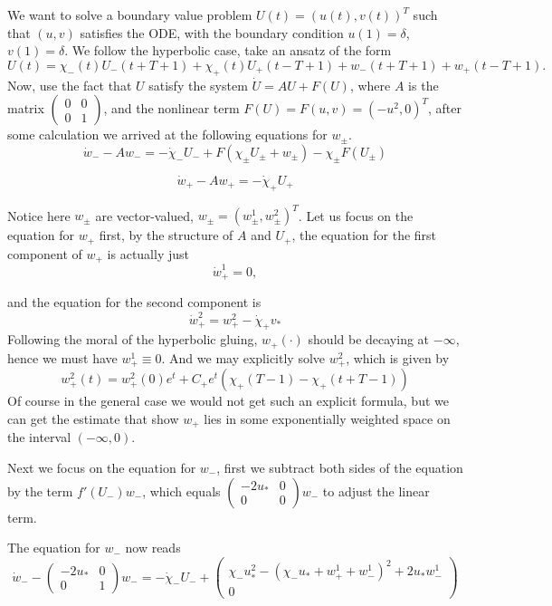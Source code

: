 \documentclass[letterpaper,11pt]{article}
\numberwithin{equation}{section}
\theoremstyle{plain}
\begin{document}
We want to solve a boundary value problem $U(t) = (u(t),v(t))^T$ such that $(u,v)$ satisfies the ODE, with the boundary condition $u(1) = \delta$, $v(1)=\delta$. We follow the hyperbolic case, take an ansatz of the form 
\[
U(t) = \chi_-(t)U_-(t+T+1) + \chi_+(t)U_+(t-T+1) + w_-(t+T+1)+w_+(t-T+1).
\]
Now, use the fact that $U$ satisfy the system $\dot{U} = AU + F(U)$, where $A$ is the matrix 
$\begin{pmatrix}
0&0\\
0&1
\end{pmatrix}$, and the nonlinear term $F(U) = F(u,v) = (-u^2,0)^T$, after some calculation we arrived at the following equations for $w_\pm$.
\begin{equation}
\dot{w}_- - Aw_- = -\dot{\chi}_- U_- + F(\chi_{\pm}U_{\pm}+w_\pm)-\chi_{\pm}F(U_\pm)
\end{equation}


\begin{equation}
\dot{w}_+ - Aw_+ = - \dot{\chi}_+ U_+
\end{equation}

Notice here $w_\pm$ are vector-valued, $w_\pm =  (w_\pm^1, w_\pm^2)^T$. Let us focus on the equation for $w_+$ first, by the structure of $A$ and $U_+$, the equation for the first component of $w_+$ is actually just
\[
\dot{w}^1_+ = 0,
\]

and the equation for the second component is
\[
\dot{w}^2_+  = w^2_+ - \dot{\chi}_+ v_*
\]
Following the moral of the hyperbolic gluing, $w_+(\cdot)$ should be decaying at $-\infty$, hence we must have $w_+^1 \equiv 0$. And we may explicitly solve $w_+^2$, which is given by
\[
w_+^2 (t) = w_+^2(0)e^{t} + C_+e^{t}\left( \chi_+(T-1)-\chi_+(t+T-1)\right)
\]
Of course in the general case we would not get such an explicit formula, but we can get the estimate that show $w_+$ lies in some exponentially weighted space on the interval $(-\infty,0)$.


Next we focus on the equation for $w_-$, first we subtract both sides of the equation by the term $f'(U_-)w_-$, which equals $\begin{pmatrix}
-2u_*&0\\
0&0
\end{pmatrix} w_-$ to adjust the linear term.



The equation for $w_-$ now reads
\[
\dot{w}_- - \begin{pmatrix}
-2u_*&0\\
0&1
\end{pmatrix} w_-= -\dot{\chi}_- U_- + \begin{pmatrix}
\chi_-u_*^2-(\chi_-u_*+w_+^1+w_-^1)^2 +2u_*w_-^1\\
0
\end{pmatrix}
\]
\end{document}
